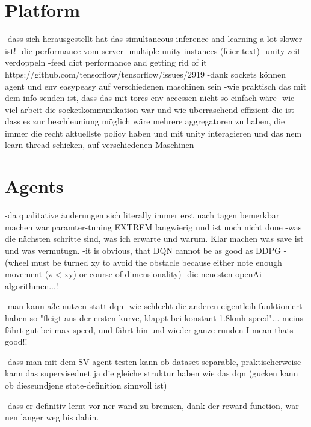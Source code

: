 \section{Platform}

-dass sich herausgestellt hat das simultaneous inference and learning a lot slower ist!
-die performance vom server
-multiple unity instances (feier-text)
-unity zeit verdoppeln
-feed dict performance and getting rid of it https://github.com/tensorflow/tensorflow/issues/2919
-dank sockets können agent und env easypeasy auf verschiedenen maschinen sein
-wie praktisch das mit dem info senden ist, dass das mit torcs-env-accessen nicht so einfach wäre
-wie viel arbeit die socketkommunikation war und wie überraschend effizient die ist
-dass es zur beschleuniung möglich wäre mehrere aggregatoren zu haben, die immer die recht aktuellste policy haben und mit unity interagieren und das nem learn-thread schicken, auf verschiedenen Maschinen

\section{Agents}

-da qualitative änderungen sich literally immer erst nach tagen bemerkbar machen war paramter-tuning EXTREM langwierig und ist noch nicht done
-was die nächsten schritte sind, was ich erwarte und warum. Klar machen was save ist und was vermutugn.
-it is obvious, that DQN cannot be as good as DDPG - (wheel must be turned xy to avoid the obstacle because either note enough movement (z < xy) or course of dimensionality)
-die neuesten openAi algorithmen...!

-man kann a3c nutzen statt dqn
-wie schlecht die anderen eigentlcih funktioniert haben so "fleigt aus der ersten kurve, klappt bei konstant 1.8kmh speed"... meins fährt gut bei max-speed, und fährt hin und wieder ganze runden I mean thats good!!

-dass man mit dem SV-agent testen kann ob dataset separable, praktischerweise kann das supervisednet ja die gleiche struktur haben wie das dqn (gucken kann ob dieseundjene state-definition sinnvoll ist)

-dass er definitiv lernt vor ner wand zu bremsen, dank der reward function, war nen langer weg bis dahin.

